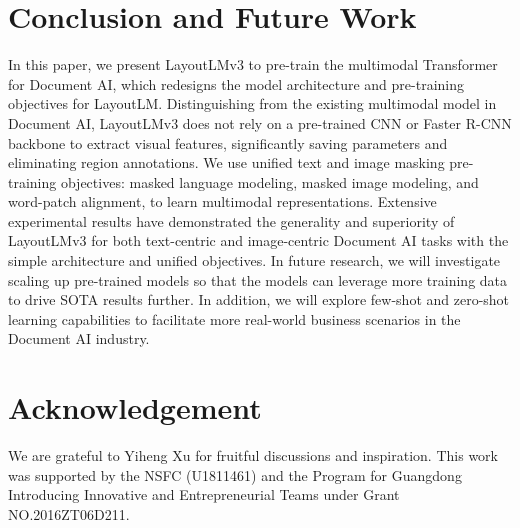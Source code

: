 \documentclass[sigconf]{acmart}
\begin{document}
\section{Conclusion and Future Work}
In this paper, we present LayoutLMv3 to pre-train the multimodal Transformer for Document AI, which redesigns the model architecture and pre-training objectives for LayoutLM. 
Distinguishing from the existing multimodal model in Document AI, LayoutLMv3 does not rely on a pre-trained CNN or Faster R-CNN backbone to extract visual features, significantly saving parameters and eliminating region annotations.
We use unified text and image masking pre-training objectives: masked language modeling, masked image modeling, and word-patch alignment, to learn multimodal representations.
Extensive experimental results have demonstrated the generality and superiority of LayoutLMv3 for both text-centric and image-centric Document AI tasks with the simple architecture and unified objectives.
In future research, we will investigate scaling up pre-trained models
so that the models can leverage more training data 
to drive SOTA results further. In addition, we will explore few-shot and zero-shot learning capabilities to facilitate more real-world business scenarios in the Document AI industry. 


\section{Acknowledgement}
We are grateful to Yiheng Xu for fruitful discussions and inspiration.
This work was supported by the NSFC (U1811461) and the Program for Guangdong Introducing Innovative and Entrepreneurial Teams under Grant NO.2016ZT06D211.
\end{document}
